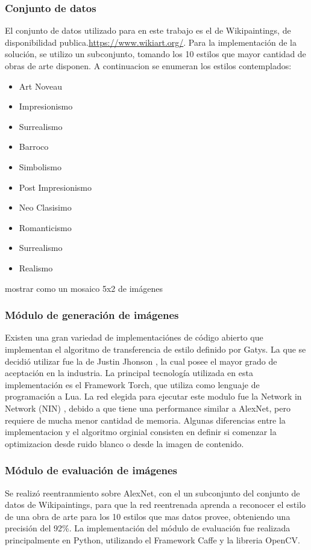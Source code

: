 \documentclass[a4paper,11pt,spanish]{book}
\begin{document}
      \subsubsection{Conjunto de datos}
	El conjunto de datos utilizado para en este trabajo es el de Wikipaintings, de disponibilidad publica.\url{https://www.wikiart.org/}. Para la implementación de la solución,
	se utilizo un subconjunto, tomando los 10 estilos que mayor cantidad de obras de arte disponen. A continuacion se enumeran los estilos contemplados:
	\begin{itemize}
	 \item Art Noveau
	 \item Impresionismo
	 \item Surrealismo
	 \item Barroco
	 \item Simbolismo
	 \item Post Impresionismo
	 \item Neo Clasisimo
	 \item Romanticismo
	 \item Surrealismo
	 \item Realismo
	\end{itemize}
        mostrar como un mosaico 5x2 de imágenes

      \subsubsection{Módulo de generación de imágenes}
	Existen una gran variedad de implementaciónes de código abierto que implementan el algoritmo de transferencia de estilo definido por Gatys.
	La que se decidió utilizar fue la de Justin Jhonson \cite{Johnson:Neural_Style}, la cual posee el mayor grado de aceptación en la industria.
	La principal tecnología utilizada en esta implementación es el Framework Torch, que utiliza como lenguaje de programación a Lua.
	La red elegida para ejecutar este modulo fue la Network in Network (NIN) \cite{NIN}, debido a que tiene una performance similar a AlexNet, pero requiere de mucha menor cantidad
	de memoria.
	Algunas diferencias entre la implementacion y el algoritmo orginial consisten en definir si comenzar la optimizacion desde ruido blanco o desde la imagen de contenido.
      \subsubsection{Módulo de evaluación de imágenes}
	Se realizó reentranmiento sobre AlexNet, con el un subconjunto del conjunto de datos de Wikipaintings, para que la red reentrenada aprenda a reconocer
	el estilo de una obra de arte para los 10 estilos que mas datos provee, obteniendo una precisión del 92\%.
	La implementación del módulo de evaluación fue realizada principalmente en Python, utilizando el Framework Caffe y la libreria OpenCV.
\end{document}
